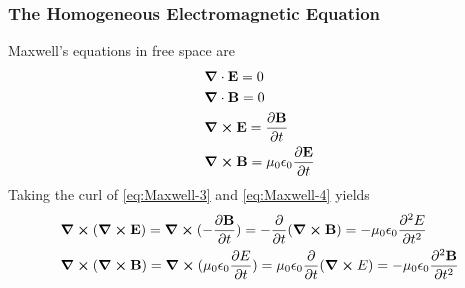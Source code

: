 \subsubsection{The Homogeneous Electromagnetic Equation}
Maxwell's equations in free space are
\begin{subequations}
    \label{eq:optim}
    \begin{align}
        &\grad \cdot \textbf{E} = 0 \label{eq:Maxwell-1} \\
        &\grad \cdot \textbf{B} = 0 \label{eq:Maxwell-2}\\
        &\grad \cross \textbf{E} = \frac{\partial\textbf{B}}{\partial t} \label{eq:Maxwell-3}\\
        &\grad \cross \textbf{B} = \mu_0 \epsilon_0 \frac{\partial\textbf{E}}{\partial t} \label{eq:Maxwell-4}
    \end{align}
\end{subequations}
Taking the curl of \ref{eq:Maxwell-3} and \ref{eq:Maxwell-4} yields
\begin{subequations} 
\label{eq:curl-}
    \begin{align}
        &\curl{ (\curl{\textbf{E}})} 
        = \curl{ (-\frac{\partial \textbf{B}}{\partial t})} 
        = -\frac{\partial}{\partial t} (\curl{\textbf{B}})
        = - \mu_0 \epsilon_0 \frac{\partial^2 E}{\partial t^2} 
        \label{eq:curl-E}\\
        &\curl{ (\curl{\textbf{B}})} 
        = \curl{ (\mu_0 \epsilon_0 \frac{\partial E}{\partial t})} 
        = \mu_0 \epsilon_0\frac{\partial}{\partial t} (\curl{E}) 
        = - \mu_0 \epsilon_0 \frac{\partial^2 \textbf{B}}{\partial t^2} 
        \label{eq:curl-B}
    \end{align}
\end{subequations}
   
